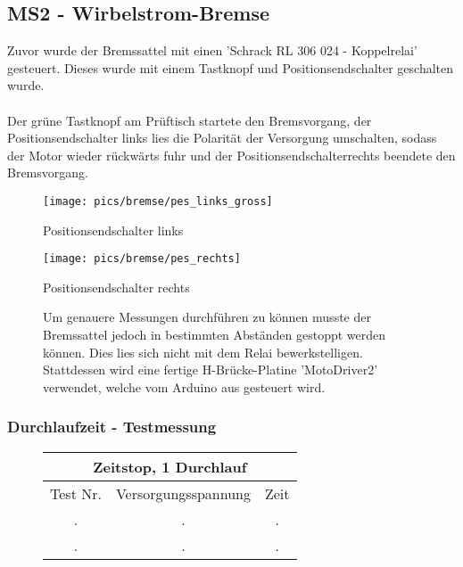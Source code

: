 \documentclass[12pt,a4paper]{article}
\begin{document}
\subsection{MS2 - Wirbelstrom-Bremse}
Zuvor wurde der Bremssattel mit einen 'Schrack RL 306 024 - Koppelrelai' gesteuert. 
Dieses wurde mit einem Tastknopf und Positionsendschalter geschalten wurde. \\\\
Der grüne Tastknopf am Prüftisch startete den Bremsvorgang, der Positionsendschalter links lies die Polarität der Versorgung umschalten, sodass der Motor wieder rückwärts fuhr und der Positionsendschalterrechts beendete den Bremsvorgang. \\
%
\begin{figure}[h!]
  \centering
  \begin{minipage}[b]{0.4\textwidth}
    \texttt{[image: pics/bremse/pes\_links\_gross]}
    \caption{Positionsendschalter links}
  \end{minipage}
  \hspace{10mm}
  \begin{minipage}[b]{0.4\textwidth}
    \texttt{[image: pics/bremse/pes\_rechts]}
    \caption{Positionsendschalter rechts}
  \end{minipage}
\end{figure}
%
\begin{figure}[h!]
Um genauere Messungen durchführen zu können musste der Bremssattel jedoch in bestimmten Abständen gestoppt werden können. 
Dies lies sich nicht mit dem Relai bewerkstelligen. \\
Stattdessen wird eine fertige H-Brücke-Platine 'MotoDriver2' verwendet, welche vom Arduino aus gesteuert wird. \\
\end{figure}
%
%
\subsubsection*{Durchlaufzeit - Testmessung}
\begin{figure}[h!]
\centering
\begin{tabular}{|c|c|c|}
\hline
\multicolumn{3}{|c|}{Zeitstop, 1 Durchlauf}\\
\hline
\hline
Test Nr. & Versorgungsspannung & Zeit \\
\hline
. & . & .\\ 
. & . & .\\
\hline
\end{tabular}
\end{figure}
%
%
\newpage
\end{document}
